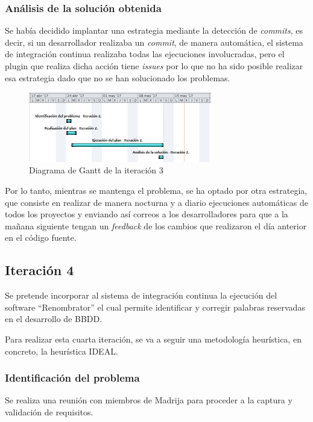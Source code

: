 \subsubsection{Análisis de la solución obtenida}

Se había decidido implantar una estrategia mediante la detección de \textit{commits}, es decir, si un desarrollador realizaba un \textit{commit}, de manera automática, el sistema de integración continua realizaba todas las ejecuciones involucradas, pero el plugin que realiza dicha acción tiene \textit{issues} por lo que no ha sido posible realizar esa estrategia dado que no se han solucionado los problemas.

\begin{figure}[!h]
\centering
   \includegraphics[width=8cm]{Diag-Gantt_It3.PNG}
\caption{Diagrama de Gantt de la iteración 3}
\end{figure}

Por lo tanto, mientras se mantenga el problema, se ha optado por otra estrategia, que consiste en realizar de manera nocturna y a diario ejecuciones automáticas de todos los proyectos y enviando así correos a los desarrolladores para que a la mañana siguiente tengan un \textit{feedback} de los cambios que realizaron el día anterior en el código fuente.

\subsection{Iteración 4}

Se pretende incorporar al sistema de integración continua la ejecución del software ``Renombrator'' el cual permite identificar y corregir palabras reservadas en el desarrollo de \ac{BBDD}.

Para realizar esta cuarta iteración, se va a seguir una metodología heurística, en concreto, la heurística IDEAL.

\subsubsection{Identificación del problema}
Se realiza una reunión con miembros de \ac{Madrija} para proceder a la captura y validación de requisitos.


